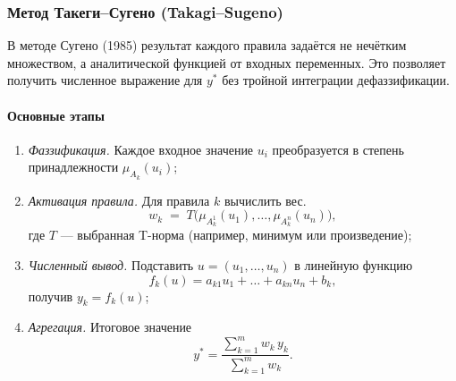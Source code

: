 \subsubsection{Метод Такеги–Сугено (Takagi–Sugeno)}
\label{subsubsec:sugeno}

В методе Сугено (1985) результат каждого правила задаётся не нечётким множеством, а аналитической функцией от входных переменных. Это позволяет получить численное выражение для $y^*$ без тройной интеграции дефаззификации.

\paragraph{Основные этапы}
\begin{enumerate}[label=\alph*)]
  \item \emph{Фаззификация.} Каждое входное значение $u_i$ преобразуется в степень принадлежности $\mu_{A_k}(u_i)$;
  \item \emph{Активация правила.} Для правила $k$ вычислить вес.
    \[
      w_k \;=\; T\bigl(\mu_{A_k^1}(u_1),\dots,\mu_{A_k^n}(u_n)\bigr),
    \]
    где $T$ — выбранная T-норма (например, минимум или произведение);
  \item \emph{Численный вывод.} Подставить $u=(u_1,\dots,u_n)$ в линейную функцию
    \[
      f_k(u) = a_{k1}u_1 + \dots + a_{kn}u_n + b_k,
    \]
    получив $y_k = f_k(u)$;
  \item \emph{Агрегация.} Итоговое значение
    \[
      y^* = \frac{\sum_{k=1}^m w_k\,y_k}{\sum_{k=1}^m w_k}.
    \]
\end{enumerate}

